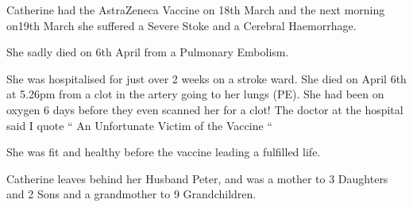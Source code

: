 Catherine had the AstraZeneca Vaccine on 18th March and the next morning on19th
March she suffered a Severe Stoke and a Cerebral Haemorrhage.

She sadly died on 6th April from a Pulmonary Embolism.

She was hospitalised for just over 2 weeks on a stroke ward. She died on April
6th at 5.26pm from a clot in the artery going to her lungs (PE). She had been on
oxygen 6 days before they even scanned her for a clot! The doctor at the
hospital said I quote “ An Unfortunate Victim of the Vaccine “

She was fit and healthy before the vaccine leading a fulfilled life.

Catherine leaves behind her Husband Peter, and was a mother to 3 Daughters and 2
Sons and a grandmother to 9 Grandchildren.

